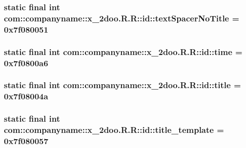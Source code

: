 \hypertarget{classcom_1_1companyname_1_1x__2doo_1_1_r_1_1id_70c30ce1e8ffa2eebcd98db138a7a905}{
\subsubsection[{textSpacerNoTitle}]{\setlength{\rightskip}{0pt plus 5cm}static final int com::companyname::x\_\-2doo.R.R::id::textSpacerNoTitle = 0x7f080051}}
\label{classcom_1_1companyname_1_1x__2doo_1_1_r_1_1id_70c30ce1e8ffa2eebcd98db138a7a905}


\hypertarget{classcom_1_1companyname_1_1x__2doo_1_1_r_1_1id_996683b9ac5b8657c0a9cc22f924ff7f}{
\subsubsection[{time}]{\setlength{\rightskip}{0pt plus 5cm}static final int com::companyname::x\_\-2doo.R.R::id::time = 0x7f0800a6}}
\label{classcom_1_1companyname_1_1x__2doo_1_1_r_1_1id_996683b9ac5b8657c0a9cc22f924ff7f}


\hypertarget{classcom_1_1companyname_1_1x__2doo_1_1_r_1_1id_bf30430c939267f9b0a8d93341c98a78}{
\subsubsection[{title}]{\setlength{\rightskip}{0pt plus 5cm}static final int com::companyname::x\_\-2doo.R.R::id::title = 0x7f08004a}}
\label{classcom_1_1companyname_1_1x__2doo_1_1_r_1_1id_bf30430c939267f9b0a8d93341c98a78}


\hypertarget{classcom_1_1companyname_1_1x__2doo_1_1_r_1_1id_d45b264bc248b44dcb331f314a647b2e}{
\subsubsection[{title\_\-template}]{\setlength{\rightskip}{0pt plus 5cm}static final int com::companyname::x\_\-2doo.R.R::id::title\_\-template = 0x7f080057}}
\label{classcom_1_1companyname_1_1x__2doo_1_1_r_1_1id_d45b264bc248b44dcb331f314a647b2e}


